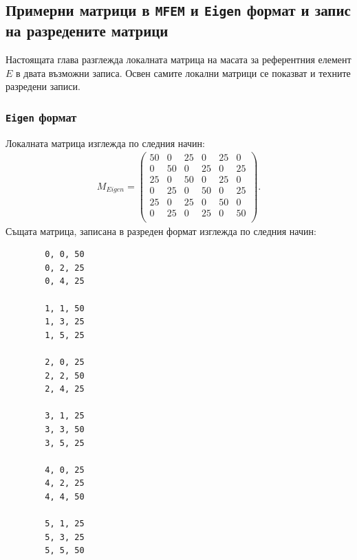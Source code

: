 \documentclass{report}
\begin{document}
	\subsection{Примерни матрици в \texttt{MFEM} и \texttt{Eigen} формат и запис на разредените матрици}\label{subsec:example_formats}
	
	Настоящата глава разглежда локалната матрица на масата за референтния елемент $E$ в двата възможни записа. Освен самите локални матрици се показват и техните разредени записи.
	\subsubsection{\texttt{Eigen} формат}
	Локалната матрица изглежда по следния начин:
	\begin{align*}
		M_{Eigen} = \begin{pmatrix}
			50 & 0 & 25 & 0 & 25 & 0\\
			0 & 50 & 0 & 25 & 0 & 25\\
			25 & 0 & 50 & 0 & 25 & 0\\
			0 & 25 & 0 & 50 & 0 & 25\\
			25 & 0 & 25 & 0 & 50 & 0\\
			0 & 25 & 0 & 25 & 0 & 50\\
		\end{pmatrix}.
	\end{align*}
	Същата матрица, записана в разреден формат изглежда по следния начин:
	\begin{verbatim}
		0, 0, 50
		0, 2, 25
		0, 4, 25
		
		1, 1, 50
		1, 3, 25
		1, 5, 25
		
		2, 0, 25
		2, 2, 50
		2, 4, 25
		
		3, 1, 25
		3, 3, 50
		3, 5, 25
		
		4, 0, 25
		4, 2, 25
		4, 4, 50
		
		5, 1, 25
		5, 3, 25
		5, 5, 50
	\end{verbatim}
\end{document}
